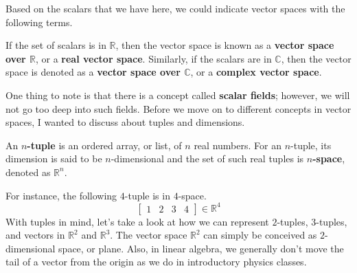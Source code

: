 \documentclass[../main.tex]{subfiles}
\begin{document}
Based on the scalars that we have here, we could indicate vector
spaces with the following terms.

\begin{definition}
If the set of scalars is in $\mathbb{R}$, then the vector space
is known as a \textbf{vector space over $\mathbb{R}$}, or a
\textbf{real vector space}. Similarly, if the scalars are in
$\mathbb{C}$, then the vector space is denoted as a
\textbf{vector space over $\mathbb{C}$}, or a \textbf{complex vector
space}.
\end{definition}

One thing to note is that there is a concept called \textbf{scalar
fields}; however, we will not go too deep into such fields.
Before we move on to different concepts in vector spaces, I wanted
to discuss about tuples and dimensions.

\begin{definition}
An \textbf{$n$-tuple} is an ordered array, or list, of $n$ real
numbers. For an $n$-tuple, its dimension is said to be $n$-dimensional
and the set of such real tuples is \textbf{$n$-space}, denoted as
$\mathbb{R}^n$.
\end{definition}

For instance, the following $4$-tuple is in $4$-space.
\[
\begin{bmatrix}
    1 & 2 & 3 & 4
\end{bmatrix}
\in
\mathbb{R}^4
\]
With tuples in mind, let's take a look at how we can represent
$2$-tuples, $3$-tuples, and vectors in $\mathbb{R}^2$ and
$\mathbb{R}^3$. The vector space $\mathbb{R}^2$ can simply be
conceived as $2$-dimensional space, or plane. Also, in linear
algebra, we generally don't move the tail of a vector from the origin
as we do in introductory physics classes.

\begin{figure}[H]
\centering
{}
\end{figure}
\end{document}

